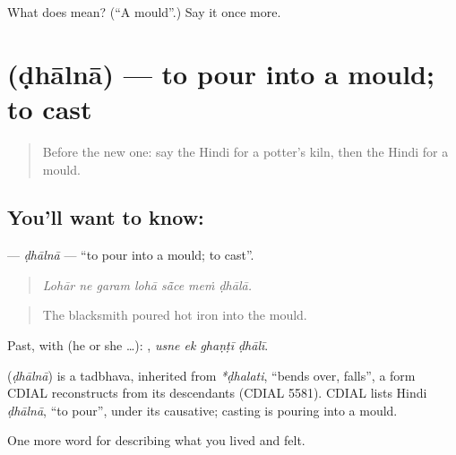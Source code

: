 \begin{tcolorbox}[breakable,colback=teal!4,colframe=teal!35!black,title={Before you move on}]
What does  mean? (\textquotedblleft{}A mould\textquotedblright{}.) Say it once more.
\end{tcolorbox}
\section[\texorpdfstring{\hi{ढालना} (ḍhālnā)}{ढालना (ḍhālnā)}]{ (ḍhālnā) — to pour into a mould; to cast}

\label{lesson:HI-C511-dhaalna}



\begin{quote}
Before the new one: say the Hindi for a potter's kiln, then the Hindi for a mould.
\end{quote}

\subsection*{You'll want to know: }
\textbf{} — \emph{ḍhālnā} — \textquotedblleft{}to pour into a mould; to cast\textquotedblright{}.

\begin{quote}
      
\end{quote}

\begin{quote}
\emph{Lohār ne garam lohā sā̃ce meṁ ḍhālā.}
\end{quote}

\begin{quote}
The blacksmith poured hot iron into the mould.
\end{quote}

Past, with  (he or she …):    , \emph{usne ek ghaṇṭī ḍhālī}.

\begin{cousinweb}
\textbf{} (\emph{ḍhālnā}) is a tadbhava, inherited from \emph{*ḍhalati}, \textquotedblleft{}bends over, falls\textquotedblright{}, a form CDIAL reconstructs from its descendants (CDIAL 5581). CDIAL lists Hindi \emph{ḍhālnā}, \textquotedblleft{}to pour\textquotedblright{}, under its causative; casting is pouring into a mould.
\end{cousinweb}

\begin{grammarlens}[title={What you've built}]
One more word for describing what you lived and felt.
\end{grammarlens}

